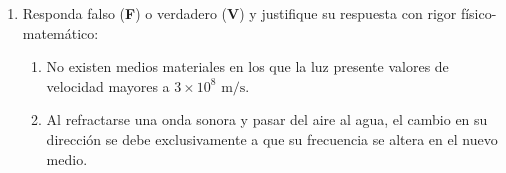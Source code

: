 \documentclass[11pt, letterpaper]{article}
\newif\ifmostrarrespuestas
\newcommand{\respuesta}[1]{
	\ifmostrarrespuestas
	\par\vspace{0.2cm}
	\textbf{\textcolor{blue}{Solución:}} \textcolor{blue}{#1}
	\vspace{0.4cm}
	\else
	\fi
}
\begin{document}
\begin{enumerate}[leftmargin=*, itemsep=0.8cm]
		\item Responda falso (\textbf{F}) o verdadero (\textbf{V}) y justifique su respuesta con rigor físico-matemático:
		\begin{enumerate}[label=\alph*., itemsep=0.2cm]
			\item No existen medios materiales en los que la luz presente valores de velocidad mayores a $3 \times 10^8 \text{ m/s}$. \underline{\hspace{1cm}}
			\item Al refractarse una onda sonora y pasar del aire al agua, el cambio en su dirección se debe exclusivamente a que su frecuencia se altera en el nuevo medio. \underline{\hspace{1cm}}
		\end{enumerate}
		\respuesta{
			a) \textbf{V}. De acuerdo con la teoría de la relatividad, la velocidad máxima en el universo es $c$ ($3 \times 10^8 \text{ m/s}$) y ocurre en el vacío. Cualquier medio material tiene un $n > 1$, lo que matemáticamente obliga a que $v = c/n$ sea siempre menor a $c$.\\
			b) \textbf{F}. La desviación (cambio de dirección) ocurre por el cambio en la \textbf{velocidad} de propagación y por ende de su longitud de onda. La frecuencia es invariante y no se altera al cambiar de medio.
		}
		
	\end{enumerate}
	
\end{document}
